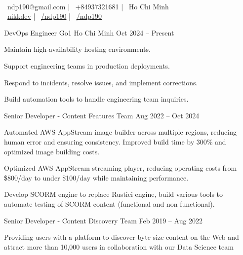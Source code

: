 \documentclass[]{awesome-cv}
\begin{document}
    
\begin{center}
      \\
	\vspace{2mm}
	{\faEnvelope\ ndp190@gmail.com} | {\faMobile\ +84937321681} | {\faMapMarker\ Ho Chi Minh} \\
	{\faHome\ \href{https://nikkdev.com/}{nikkdev}} | {\faLinkedinSquare\ \href{https://www.linkedin.com/in/ndp190}{/ndp190}} | {\faGithubSquare\ \href{https://github.com/ndp190}{/ndp190}}
\end{center}

\begin{cventries}
	\cventry
    {DevOps Engineer}
	{Go1}
	{Ho Chi Minh}
	{Oct 2024 – Present}
	{\begin{cvitems}
    \item {Maintain high-availability hosting environments.}
    \item {Support engineering teams in production deployments.}
    \item {Respond to incidents, resolve issues, and implement corrections.}
    \item {Build automation tools to handle engineering team inquiries.}
		\end{cvitems}}
	\cventry
    {Senior Developer - Content Features Team}
	{}
	{}
	{Aug 2022 – Oct 2024}
	{\begin{cvitems}
    \item {Automated AWS AppStream image builder across multiple regions, reducing human error and ensuring consistency. Improved build time by 300\% and optimized image building costs.}
    \item {Optimized AWS AppStream streaming player, reducing operating costs from \$800/day to under \$100/day while maintaining performance.}
    \item {Develop SCORM engine to replace Rustici engine, build various tools to automate testing of SCORM content (functional and non functional).}
		\end{cvitems}}
	\cventry
	{Senior Developer - Content Discovery Team}
	{}
	{}
	{Feb 2019 – Aug 2022}
	{\begin{cvitems}
		\item {Providing users with a platform to discover byte-size content on the Web and attract more than 10,000 users in collaboration with our Data Science team}

\end{cvitems}}
\end{cventries}
\end{document}
